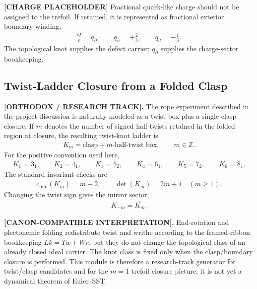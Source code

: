 \textbf{[CHARGE PLACEHOLDER]} Fractional quark-like charge should not be assigned to the trefoil. If retained, it is represented as fractional exterior boundary winding,
\begin{align}
    \frac{Q}{e}=q_{\partial},
    \qquad
    q_u=+\frac{2}{3},
    \qquad
    q_d=-\frac{1}{3}.
\end{align}
The topological knot supplies the defect carrier; $q_{\partial}$ supplies the charge-sector bookkeeping.

\subsection{Twist-Ladder Closure from a Folded Clasp}
\label{subsec:rt_twist_ladder_closure}

\textbf{[ORTHODOX / RESEARCH TRACK].}
The rope experiment described in the project discussion is naturally modeled as
a twist box plus a single clasp closure. If \(m\) denotes the number of signed
half-twists retained in the folded region at closure, the resulting twist-knot
ladder is
\begin{align}
    K_m
    =
    \text{clasp}+\text{\(m\)-half-twist box},
    \qquad
    m\in\mathbb{Z}.
    \label{eq:rt_twist_ladder_Km}
\end{align}
For the positive convention used here,
\begin{align}
    K_1=3_1,\qquad
    K_2=4_1,\qquad
    K_3=5_2,\qquad
    K_4=6_1,\qquad
    K_5=7_2,\qquad
    K_6=8_1 .
    \label{eq:rt_twist_ladder_first_terms}
\end{align}
The standard invariant checks are
\begin{align}
    c_{\min}(K_m)=m+2,
    \qquad
    \det(K_m)=2m+1
    \quad (m\ge 1).
    \label{eq:rt_twist_ladder_invariants}
\end{align}
Changing the twist sign gives the mirror sector,
\begin{align}
    K_{-m}=\overline{K_m}.
    \label{eq:rt_twist_ladder_mirror}
\end{align}

\textbf{[CANON-COMPATIBLE INTERPRETATION].}
End-rotation and plectonemic folding redistribute twist and writhe according
to the framed-ribbon bookkeeping \(Lk=Tw+Wr\), but they do not change the
topological class of an already closed ideal carrier. The knot class is fixed
only when the clasp/boundary closure is performed. This module is therefore a
research-track generator for twist/clasp candidates and for the \(m=1\) trefoil
closure picture; it is not yet a dynamical theorem of Euler--SST.

